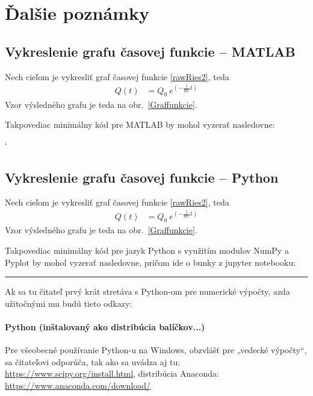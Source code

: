 \documentclass[a4paper, 10pt, ]{article}
\begin{document}
\section{Ďalšie poznámky}

\subsection{Vykreslenie grafu časovej funkcie -- MATLAB}

Nech cieľom je vykresliť graf časovej funkcie \eqref{rawRies2}, teda
\begin{align*}
    Q(t)   &=  Q_0 \ e^{\left( - \frac{1}{RC} t \right)}   
\end{align*}
Vzor výsledného grafu je teda na obr.~\ref{Graffunkcie}.

Takpovediac minimálny kód pre MATLAB by mohol vyzerať nasledovne:

{\catcode`

}






\subsection{Vykreslenie grafu časovej funkcie -- Python}

Nech cieľom je vykresliť graf časovej funkcie \eqref{rawRies2}, teda
\begin{align*}
    Q(t)   &=  Q_0 \ e^{\left( - \frac{1}{RC} t \right)}   
\end{align*}
Vzor výsledného grafu je teda na obr.~\ref{Graffunkcie}.

Takpovediac minimálny kód pre jazyk Python s využitím modulov NumPy a Pyplot by mohol vyzerať nasledovne, pričom ide o bunky z jupyter notebooku:







\bigskip

\noindent
\hrule

\medskip

\noindent
Ak sa tu čitateľ prvý krát stretáva s Python-om pre numerické výpočty, azda užitočnými mu budú tieto odkazy:

\paragraph{Python (inštalovaný ako distribúcia balíčkov...)}
Pre všeobecné používanie Python-u na Windows, obzvlášť pre „vedecké výpočty“, sa čitateľovi odporúča, tak ako sa uvádza aj tu: \url{https://www.scipy.org/install.html}, distribúcia Anaconda: \url{https://www.anaconda.com/download/}
\end{document}
